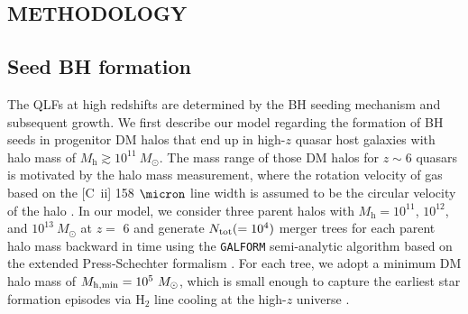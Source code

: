 \documentclass[twocolumn, twocolappendix]{aastex63}
\newcommand{\Msun}{M_\odot}
\newcommand{\Mh}{M_\mathrm{h}}
\begin{document}
\begin{CJK*}{UTF8}{gbsn}
\vspace{2mm}
\section{METHODOLOGY}\label{sec:method}

\vspace{2mm}
\subsection{Seed BH formation}\label{sec:seed}
The QLFs at high redshifts are determined by the BH seeding mechanism and subsequent growth. 
We first describe our model regarding the formation of BH seeds in progenitor DM halos 
that end up in high-$z$ quasar host galaxies with halo mass of $\Mh \gtrsim 10^{11}~\Msun$.
The mass range of those DM halos for $z\sim 6$ quasars is motivated by the halo mass measurement, 
where the rotation velocity of gas based on the [C~{\sc ii}] 158 $\micron$ line width is assumed to be the circular velocity of the halo
\citep{2002ApJ...578...90F,2013ApJ...773...44W,2019ApJ...872L..29S}.
In our model, we consider three parent halos with $\Mh = 10^{11}$, $10^{12}$, and $10^{13} ~\Msun$ at $z=$ 6
and generate $N_{\rm tot} (= 10^4)$ merger trees for each parent halo mass backward in time using the {\tt GALFORM} 
semi-analytic algorithm based on the extended Press-Schechter formalism 
\citep{1974ApJ...187..425P,2000MNRAS.319..168C,2008MNRAS.383..557P}.
For each tree, we adopt a minimum DM halo mass of $M_{\rm h,min}=10^5~\Msun$, which is small enough to capture 
the earliest star formation episodes via H$_2$ line cooling at the high-$z$ universe \citep{1996ApJ...464..523H,1997ApJ...474....1T}.



\end{CJK*}
\end{document}

